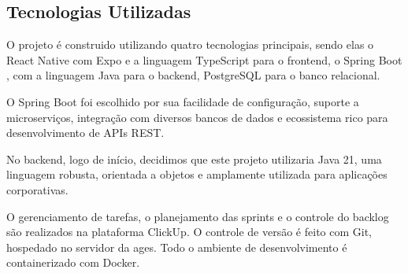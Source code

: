 \subsection{Tecnologias Utilizadas}
  O projeto é construido utilizando quatro tecnologias principais, sendo elas o React Native \cite{react} com Expo \cite{nextjs} e a linguagem TypeScript \cite{typescript} para o frontend, o Spring Boot \cite{fastapi}, com a linguagem Java para o backend, PostgreSQL para o banco relacional.
  
  O Spring Boot foi escolhido por sua facilidade de configuração, suporte a microserviços, integração com diversos bancos de dados e ecossistema rico para desenvolvimento de APIs REST.

  No backend, logo de início, decidimos que este projeto utilizaria Java 21, uma linguagem robusta, orientada a objetos e amplamente utilizada para aplicações corporativas.

  O gerenciamento de tarefas, o planejamento das sprints e o controle do backlog são realizados na plataforma ClickUp. O controle de versão é feito com Git, hospedado no servidor da \acs{ages}. Todo o ambiente de desenvolvimento é containerizado com Docker.